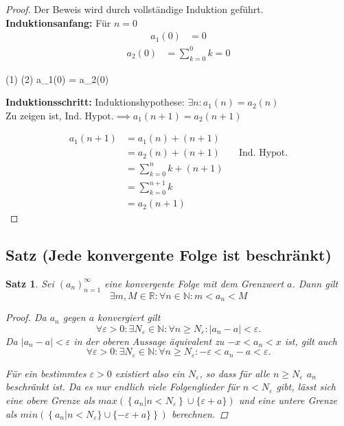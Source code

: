 \documentclass{article}
\newtheorem{thm}{Satz}[section]
\newenvironment{aleq}{
\begin{equation}
\begin{aligned}
}{
\end{aligned}
\end{equation}
}
\newenvironment{aleq*}{\begin{equation*}\begin{aligned}}{\end{aligned}\end{equation*}}
\begin{document}
	\begin{proof} Der Beweis wird durch vollständige Induktion geführt. \\
	\textbf{Induktionsanfang:} Für \(n=0\)
	\begin{aleq}
			a_1(0) &= 0 
	\end{aleq}
	\begin{aleq}
			a_2(0) &= \sum_{k=0}^{0} k = 0
	\end{aleq}
	\begin{aleq*}
		(1) \land (2) \implies a_1(0) = a_2(0)
	\end{aleq*}
	
	
	\textbf{Induktionsschritt:} Induktionshypothese: \(\exists n \colon a_1(n) = a_2(n)\) \\
	Zu zeigen ist, \(\text{Ind. Hypot.} \implies a_1(n+1) = a_2(n+1)\)
	
	\begin{equation*}
		\begin{aligned}
			a_1(n+1) &= a_1(n) + (n+1) \\
			&= a_2(n) + (n+1) && \text{Ind. Hypot.} \\
			&= \sum_{k=0}^{n}k + (n+1) \\
			&= \sum_{k=0}^{n+1}k \\
			&= a_2(n+1)
		\end{aligned}
	\end{equation*}
	\end{proof}
	
	\subsection{Satz (Jede konvergente Folge ist beschränkt)}
	\begin{thm}
		Sei \((a_n)_{n=1}^{\infty}\) eine konvergente Folge mit dem Grenzwert \(a\). Dann gilt
		\[
		\exists m,M \in \mathbb{R} \colon \forall n \in \mathbb{N} \colon m < a_n < M
		\]
		
		\begin{proof}
			Da \(a_n\) gegen \(a\) konvergiert gilt
		\[
		\forall \varepsilon>0 \colon \exists N_{\varepsilon} \in \mathbb{N} \colon \forall n \geq N_{\varepsilon} \colon |a_n - a| < \varepsilon \text{.}
		\]
		Da \(|a_n - a| < \varepsilon\) in der oberen Aussage äquivalent zu \(-x < a_n < x\) ist, gilt auch
		\[
		\forall \varepsilon>0 \colon \exists N_{\varepsilon} \in \mathbb{N} \colon \forall n \geq N_{\varepsilon} \colon -\varepsilon < a_n - a < \varepsilon \text{.}
		\]
		\par
		Für ein bestimmtes \(\varepsilon > 0\) existiert also ein \(N_{\varepsilon}\), so dass 
		für alle \(n \geq N_{\varepsilon}\) \(a_n\) beschränkt ist. Da es nur endlich viele Folgenglieder für \(n < N_{\varepsilon}\) gibt, lässt sich eine obere Grenze als \(max (\left\lbrace a_n | n < N_{\varepsilon} \right\rbrace  \cup \lbrace \varepsilon + a \rbrace)\) und eine untere Grenze als \(min (\left\lbrace a_n | n < N_{\varepsilon} \rbrace \cup \lbrace -\varepsilon + a \rbrace\right\rbrace)\) berechnen.
		\end{proof}
	\end{thm}
	
\end{document}
